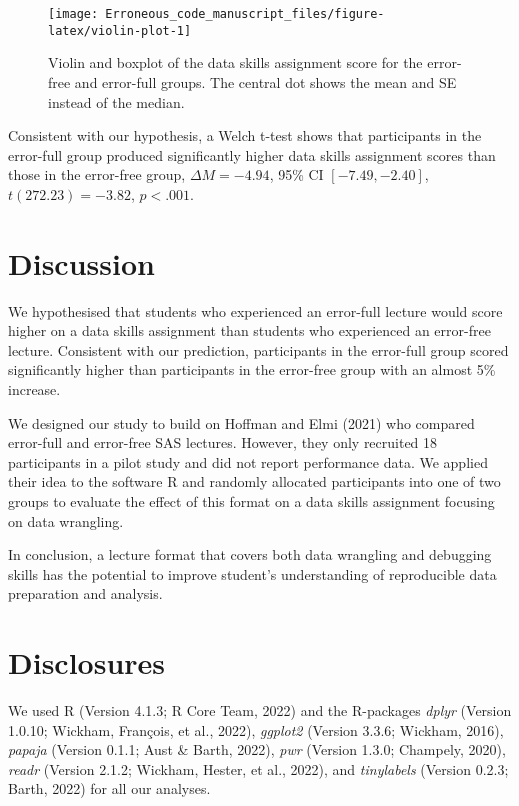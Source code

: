 \documentclass[
  man,floatsintext]{apa6}
\begin{document}
\begin{figure}
\texttt{[image: Erroneous\_code\_manuscript\_files/figure-latex/violin-plot-1]} \caption{Violin and boxplot of the data skills assignment score for the error-free and error-full groups. The central dot shows the mean and SE instead of the median.}\label{fig:violin-plot}
\end{figure}

Consistent with our hypothesis, a Welch t-test shows that participants in the error-full group produced significantly higher data skills assignment scores than those in the error-free group, \(\Delta M = -4.94\), 95\% CI \([-7.49, -2.40]\), \(t(272.23) = -3.82\), \(p < .001\).

\hypertarget{discussion}{%
\section{Discussion}\label{discussion}}

We hypothesised that students who experienced an error-full lecture would score higher on a data skills assignment than students who experienced an error-free lecture. Consistent with our prediction, participants in the error-full group scored significantly higher than participants in the error-free group with an almost 5\% increase.

We designed our study to build on Hoffman and Elmi (2021) who compared error-full and error-free SAS lectures. However, they only recruited 18 participants in a pilot study and did not report performance data. We applied their idea to the software R and randomly allocated participants into one of two groups to evaluate the effect of this format on a data skills assignment focusing on data wrangling.

In conclusion, a lecture format that covers both data wrangling and debugging skills has the potential to improve student's understanding of reproducible data preparation and analysis.

\hypertarget{disclosures}{%
\section{Disclosures}\label{disclosures}}

We used R (Version 4.1.3; R Core Team, 2022) and the R-packages \emph{dplyr} (Version 1.0.10; Wickham, François, et al., 2022), \emph{ggplot2} (Version 3.3.6; Wickham, 2016), \emph{papaja} (Version 0.1.1; Aust \& Barth, 2022), \emph{pwr} (Version 1.3.0; Champely, 2020), \emph{readr} (Version 2.1.2; Wickham, Hester, et al., 2022), and \emph{tinylabels} (Version 0.2.3; Barth, 2022) for all our analyses.
\end{document}
